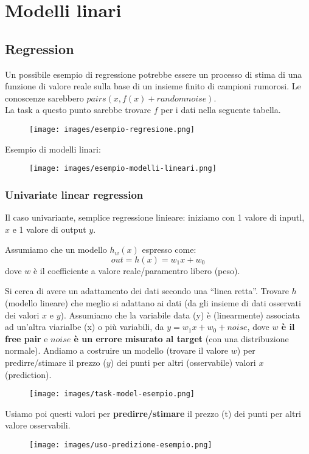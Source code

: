\newpage
\section{Modelli linari}
\subsection{Regression}
Un possibile esempio di regressione potrebbe essere un processo di stima di una funzione di valore
reale sulla base di un insieme finito di campioni rumorosi. Le conoscenze sarebbero $pairs(x, f(x) + random noise)$.\\
La task a questo punto sarebbe trovare $f$ per i dati nella seguente tabella.
\begin{figure}[h!]
    \centering
    \texttt{[image: images/esempio-regresione.png]}
\end{figure}
\begin{example}
    Esempio di modelli linari:
    \begin{figure}[h!]
        \centering
        \texttt{[image: images/esempio-modelli-lineari.png]}
    \end{figure}
\end{example}

\subsubsection{Univariate linear regression}
Il caso univariante, semplice regressione linieare: iniziamo con 1 valore di inputl, $x$ e 
1 valore di output $y$.
\begin{definition}
    Assumiamo che un modello $h_w(x)$ espresso come:
    $$out = h(x) = w_1x + w_0$$
    dove $w$ è il coefficiente a valore reale/paramentro libero (peso).
\end{definition}
Si cerca di avere un adattamento dei dati secondo una “linea retta”. Trovare $h$ (modello lineare) che 
meglio si adattano ai dati (da gli insieme di dati osservati dei valori $x$ e $y$). Assumiamo che la variabile data (y) è (linearmente) 
associata ad un'altra viarialbe (x) o più variabili, da $y = w_1x + w_0 + noise$, dove \textbf{$w$ è il free pair} e \textbf{$noise$ è
un errore misurato al target} (con una distribuzione normale). Andiamo a costruire un modello (trovare il valore $w$) per predirre/stimare il prezzo ($y$) dei punti
per altri (osservabile) valori $x$ (prediction).
\begin{figure}[h!]
    \centering
    \texttt{[image: images/task-model-esempio.png]}
\end{figure}
Usiamo poi questi valori per \textbf{predirre/stimare} il prezzo (t) dei punti per altri valore osservabili.
\begin{figure}[h!]
    \centering
    \texttt{[image: images/uso-predizione-esempio.png]}
\end{figure}


